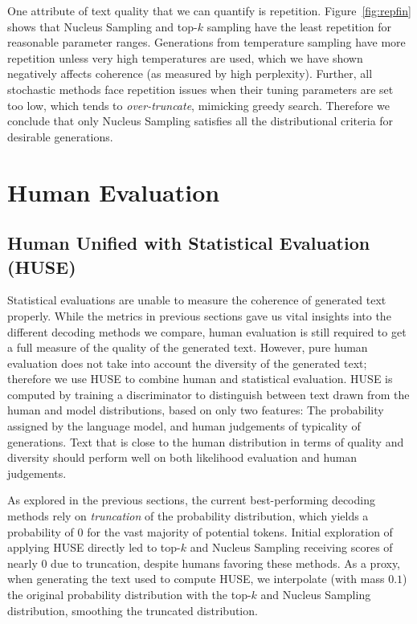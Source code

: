 \label{ssec:rep}

One attribute of text quality that we can quantify is repetition. 
Figure~\ref{fig:repfin} shows that Nucleus Sampling and top-$k$ sampling have the least repetition for reasonable parameter ranges.  Generations from temperature sampling have more repetition unless very high temperatures are used, which we have shown negatively affects coherence (as measured by high perplexity). Further, all stochastic methods face repetition issues when their tuning parameters are set too low, which tends to \textit{over-truncate}, mimicking greedy search. Therefore we conclude that only Nucleus Sampling satisfies all the distributional criteria for desirable generations.

 \section{Human Evaluation}

\subsection{Human Unified with Statistical Evaluation (HUSE)}
\label{huse}

Statistical evaluations are unable to measure the coherence of generated text properly. While the metrics in previous sections gave us vital insights into the different decoding methods we compare, human evaluation is still required to get a full measure of the quality of the generated text. However, pure human evaluation does not take into account the diversity of the generated text; therefore we use HUSE \citep{hashimoto20190unifying} to combine human and statistical evaluation. HUSE is computed by training a discriminator to distinguish between text drawn from the human and model distributions, based on only two features: The probability assigned by the language model, and human judgements of typicality of generations. Text that is close to the human distribution in terms of quality and diversity should perform well on both likelihood evaluation and human judgements. 

As explored in the previous sections, the current best-performing decoding methods rely on \textit{truncation} of the probability distribution, which yields a probability of 0 for the vast majority of potential tokens. Initial exploration of applying HUSE directly led to top-$k$ and Nucleus Sampling receiving scores of nearly 0 due to truncation, despite humans favoring these methods. As a proxy, when generating the text used to compute HUSE, we interpolate (with mass $0.1$) the original probability distribution with the top-$k$ and Nucleus Sampling distribution, smoothing the truncated distribution. 


